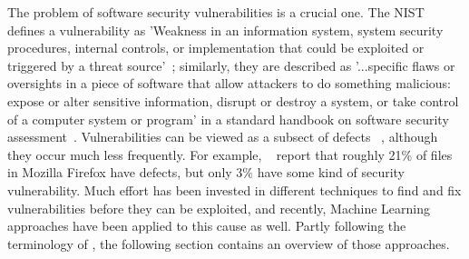 \documentclass[
	a4paper,
	pagesize,
	pdftex,
	12pt,
	twoside, %
	BCOR=5mm, %
	ngerman,
	fleqn,
	final,
	]{scrartcl}
\begin{document}
The problem of software security vulnerabilities is a crucial one. The NIST defines a vulnerability as 'Weakness in an information system, system security procedures, internal controls, or implementation that could be exploited or triggered by a threat source'~\cite{NISTComputerSecurityRessourceCenter.}; similarly, they are described as '...specific flaws or oversights
in a piece of software that allow attackers to do something malicious: expose or alter sensitive information, disrupt or destroy a system, or take control of a computer system or program' in a standard handbook on software security assessment~\cite{Dowd.2006}.
Vulnerabilities can be viewed as a subsect of defects ~\cite{Morrison.2015}, although they occur much less frequently. For example, ~\cite{Shin.2013} report that roughly 21\% of files in Mozilla Firefox have defects, but only 3\% have some kind of security vulnerability. 
Much effort has been invested in different techniques to find and fix vulnerabilities before they can be exploited, and recently, Machine Learning approaches have been applied to this cause as well. Partly following the terminology of \citep{Ghaffarian.2017}, the following section contains an overview of those approaches. 

\end{document}
